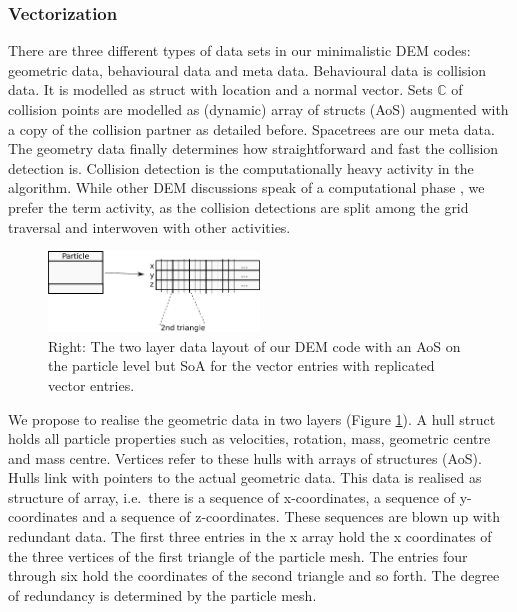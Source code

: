 \documentclass[times,12pt]{article}
\begin{document}
\subsubsection{Vectorization}

There are three different types of data sets in our minimalistic DEM codes: 
geometric data, behavioural data and meta data. 
Behavioural data is collision data.
It is modelled as struct with location and a normal vector.
Sets $\mathbb{C}$ of collision points are modelled as (dynamic) array of structs
(AoS) augmented with a copy of the collision partner as detailed before.
Spacetrees are our meta data.
The geometry data finally determines how straightforward and fast the collision
detection is. Collision detection is the computationally heavy activity in the
algorithm.
While other DEM discussions speak of a computational phase \cite{Wachs2012, Wachs2012a, Rycroft2012, Parteli2013}, we
prefer the term activity, as the collision detections are split among the grid traversal
and interwoven with other activities.

\begin{figure}
 \begin{center}
  \includegraphics[width=0.5\textwidth]{sketches/data-structure.pdf}
 \end{center}
 \caption{
   Right: The two layer data layout of our DEM code with an AoS on the particle
   level but SoA for the vector entries with replicated vector entries.
 }
 \label{figure:data-structure}
\end{figure}

We propose to realise the geometric data in two layers (Figure
\ref{figure:data-structure}).
A hull struct holds all particle properties such as velocities, rotation, mass,
geometric centre and mass centre.
Vertices refer to these hulls with arrays of structures (AoS).
Hulls link with pointers to the actual geometric data. 
This data is realised as structure of array, i.e.~there is a sequence of
x-coordinates, a sequence of y-coordinates and a sequence of z-coordinates.
These sequences are blown up with redundant data.
The first three entries in the x array hold the x coordinates of the three
vertices of the first triangle of the particle mesh.
The entries four through six hold the coordinates of the second triangle and so
forth. 
The degree of redundancy is determined by the particle mesh.
\end{document}
